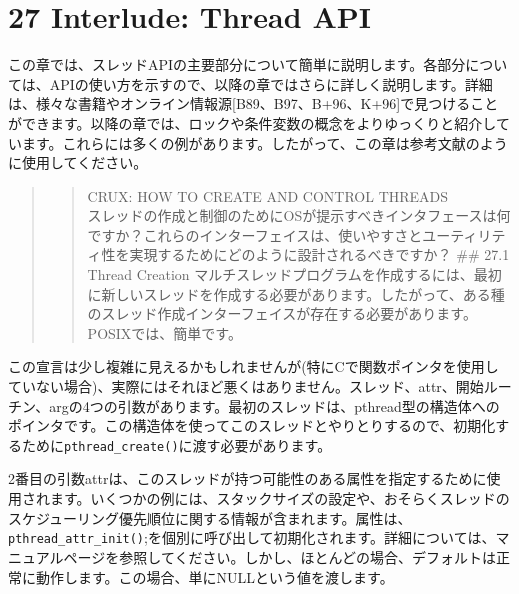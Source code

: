 \hypertarget{interlude-thread-api}{%
\section*{27 Interlude: Thread API}\label{interlude-thread-api}}

この章では、スレッドAPIの主要部分について簡単に説明します。各部分については、APIの使い方を示すので、以降の章ではさらに詳しく説明します。詳細は、様々な書籍やオンライン情報源{[}B89、B97、B+96、K+96{]}で見つけることができます。以降の章では、ロックや条件変数の概念をよりゆっくりと紹介しています。これらには多くの例があります。したがって、この章は参考文献のように使用してください。

\begin{quote}
\begin{quote}
CRUX: HOW TO CREATE AND CONTROL THREADS\\
スレッドの作成と制御のためにOSが提示すべきインタフェースは何ですか？これらのインターフェイスは、使いやすさとユーティリティ性を実現するためにどのように設計されるべきですか？
\#\# 27.1 Thread Creation
マルチスレッドプログラムを作成するには、最初に新しいスレッドを作成する必要があります。したがって、ある種のスレッド作成インターフェイスが存在する必要があります。POSIXでは、簡単です。
\end{quote}
\end{quote}

\begin{Shaded}
\begin{Highlighting}[]
                \NormalTok{*),}
\end{Highlighting}
\end{Shaded}

この宣言は少し複雑に見えるかもしれませんが(特にCで関数ポインタを使用していない場合)、実際にはそれほど悪くはありません。スレッド、attr、開始ルーチン、argの4つの引数があります。最初のスレッドは、pthread型の構造体へのポインタです。この構造体を使ってこのスレッドとやりとりするので、初期化するために\texttt{pthread\_create()}に渡す必要があります。

2番目の引数attrは、このスレッドが持つ可能性のある属性を指定するために使用されます。いくつかの例には、スタックサイズの設定や、おそらくスレッドのスケジューリング優先順位に関する情報が含まれます。属性は、\texttt{pthread\_attr\_init()};を個別に呼び出して初期化されます。詳細については、マニュアルページを参照してください。しかし、ほとんどの場合、デフォルトは正常に動作します。この場合、単にNULLという値を渡します。

